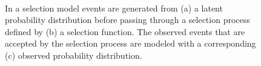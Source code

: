 \documentclass[
  letterpaper,
  DIV=11,
  numbers=noendperiod]{scrartcl}
\begin{document}
\begin{figure}
\begin{minipage}{0.32\linewidth}
{}

\subcaption{\label{fig-selection}}

\end{minipage}%
%
\begin{minipage}{0.32\linewidth}


\subcaption{\label{fig-observed}}

\end{minipage}%
%
\begin{minipage}{0.02\linewidth}
~\end{minipage}%

\caption{\label{fig-selection-model}In a selection model events are
generated from (a) a latent probability distribution before passing
through a selection process defined by (b) a selection function. The
observed events that are accepted by the selection process are modeled
with a corresponding (c) observed probability distribution.}

\end{figure}%
\end{document}
